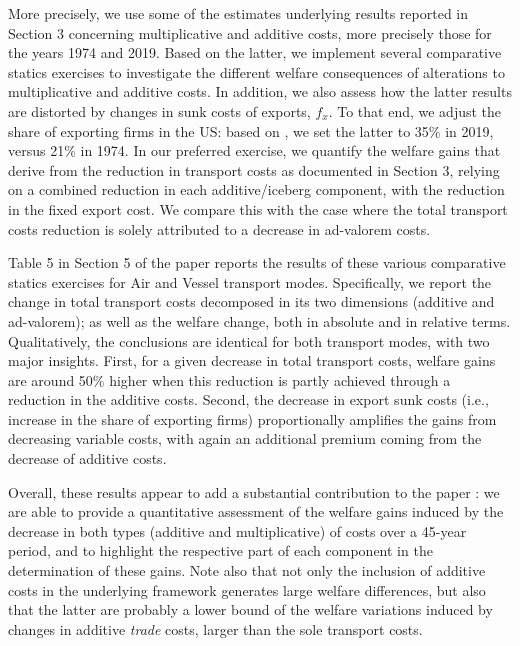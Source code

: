 \documentclass[a4paper,11pt]{article}
\begin{document}
More precisely, we use some of the estimates underlying results reported in Section 3 concerning multiplicative and additive costs, more precisely those for the years 1974 and 2019. Based on the latter, we implement several comparative statics exercises to investigate the different welfare consequences of alterations to multiplicative and additive costs. In addition, we also assess how the latter results are distorted by changes in sunk costs of exports, $f_{x}$. To that end, we adjust the share of exporting firms in the US: based on \citet{Lincoln_McCallum2018}, we set the latter to 35\% in 2019, versus 21\% in 1974. In our preferred exercise, we quantify the welfare gains that derive from the reduction in transport costs as documented in Section 3, relying on a combined reduction in each additive/iceberg component, with the reduction in the fixed export cost. We compare this with the case where the total transport costs reduction is solely attributed to a decrease in ad-valorem costs.

Table 5 in Section 5 of the paper reports the results of these various comparative statics exercises for Air and Vessel transport modes. Specifically, we report the change in total transport costs decomposed in its two dimensions (additive and ad-valorem); as well as the welfare change, both in absolute and in relative terms. Qualitatively, the conclusions are identical for both transport modes, with two major insights. First, for a given decrease in total transport costs,  welfare gains are around 50\% higher when this reduction is partly achieved through a reduction in the additive costs. Second, the decrease in export sunk costs (i.e., increase in the share of exporting firms) proportionally amplifies the gains from decreasing variable costs, with again an additional premium coming from the decrease of additive costs.

Overall, these results appear to add a substantial contribution to the paper : we are able to provide a quantitative assessment of the welfare gains induced by the decrease in both types (additive and multiplicative) of costs over a 45-year period, and to highlight the respective part of each component in the determination of these gains. Note also that not only the inclusion of additive costs in the underlying framework generates large welfare differences, but also that the latter are probably a lower bound of the welfare variations induced by changes in additive \emph{trade} costs, larger than the sole transport costs.
\end{document}
